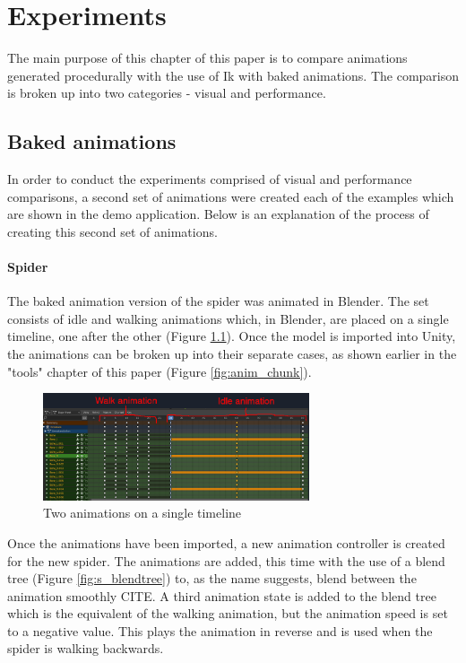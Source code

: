 \chapter{Experiments}
The main purpose of this chapter of this paper is to compare animations
generated procedurally with the use of Ik with baked animations. The comparison
is broken up into two categories - visual and performance. 

\section{Baked animations}
 In order to conduct the experiments comprised of visual and performance
 comparisons, a second set of animations were created each of the examples which
 are shown in the demo application. Below is an explanation of the process of
 creating this second set of animations.

\subsubsection{Spider}
The baked animation version of the spider was animated in Blender. The set
consists of idle and walking animations which, in Blender, are placed on
a single timeline, one after the other (Figure \ref{fig:timeline}). Once the model is imported
into Unity, the animations can be broken up into their separate cases, as shown
earlier in the "tools" chapter of this paper (Figure \ref{fig:anim_chunk}). 

\begin{figure}[h!]
    \centering
    \includegraphics[width=0.7\textwidth]{grafika/blender_timeline.png}
    \caption{Two animations on a single timeline}
    \label{fig:timeline}
\end{figure}

Once the animations have been imported, a new animation controller is created
for the new spider. The animations are added, this time with the use of a blend
tree (Figure \ref{fig:s_blendtree}) to, as the name suggests, blend between the
animation smoothly CITE. A third animation state is added to the blend tree
which is the equivalent of the walking animation, but the animation speed is set
to a negative value. This plays the animation in reverse and is used when the
spider is walking backwards. 

